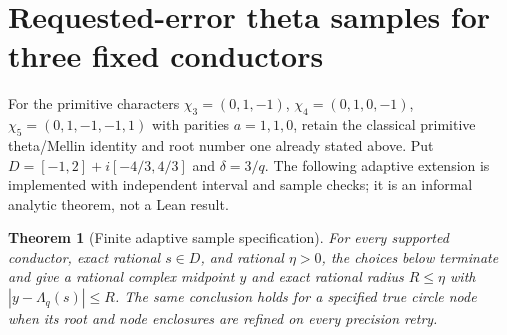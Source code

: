 \documentclass[11pt,oneside,openany]{book}
\newtheorem{theorem}{Theorem}[chapter]
\theoremstyle{definition}\newtheorem{definition}[theorem]{Definition}
\theoremstyle{remark}\newtheorem{remark}[theorem]{Remark}
\begin{document}
\section{Requested-error theta samples for three fixed conductors}\label{at:sampling}
For the primitive characters $\chi_3=(0,1,-1)$, $\chi_4=(0,1,0,-1)$,
$\chi_5=(0,1,-1,-1,1)$ with parities $a=1,1,0$, retain the classical
primitive theta/Mellin identity and root number one already stated above.
Put $D=[-1,2]+i[-4/3,4/3]$ and $\delta=3/q$.
The following adaptive extension is implemented with independent interval
and sample checks; it is an informal analytic theorem, not a Lean result.
\begin{theorem}[Finite adaptive sample specification]\label{at:sample}
For every supported conductor, exact rational $s\in D$, and rational
$\eta>0$, the choices below terminate and give a rational complex midpoint
$y$ and exact rational radius $R\le\eta$ with
$|y-\Lambda_q(s)|\le R$.
The same conclusion holds for a specified true circle node when its
root and node enclosures are refined on every precision retry.
\end{theorem}
\end{document}
